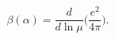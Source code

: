\begin{equation}\label{Beta_Definition}
\beta(\alpha) = \frac{d}{d\ln\mu}\Bigg(\frac{e^2}{4\pi}\Bigg).
\end{equation}

